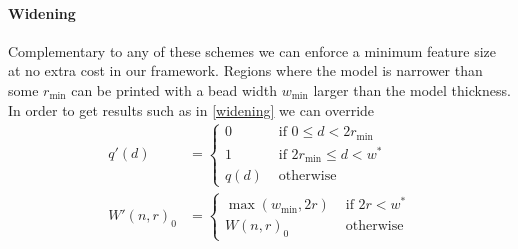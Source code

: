 \paragraph{Widening }
Complementary to any of these schemes we can enforce a minimum feature size at no extra cost in our framework.
Regions where the model is narrower than some $r_\text{min}$ can be printed with a bead width $w_\text{min}$ larger than the model thickness.
In order to get results such as in \cref{widening} we can override
\begin{align*}
q'(d) &= 
\begin{cases}
0 & \text{ if } 0 \leq d < 2 r_\text{min} \\
1 & \text{ if }  2 r_\text{min} \leq d < w^*  \\
q(d) & \text{ otherwise}
\end{cases}
\\
W'(n,r)_0 &=
\begin{cases}
\max \left( w_\text{min}  ,  2 r \right) & \text{ if } 2 r < w^* \\
W(n,r)_0 & \text{ otherwise}
\end{cases}
\end{align*}



